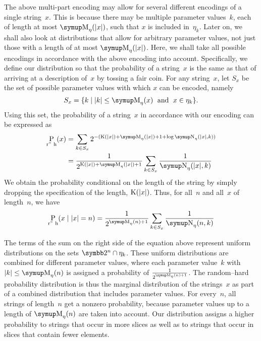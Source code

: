 The above multi-part encoding may allow for several different encodings of a single string~$x$.
This is because there may be multiple parameter values~$k$, each of length at most $\upM_\eta(\length{x})$, such that $x$ is included in~$\eta_k$.
Later on, we shall also look at distributions that allow for arbitrary parameter values, not just those with a length of at most $\upM_\eta(\length{x})$.
Here, we shall take all possible encodings in accordance with the above encoding into account.
Specifically, we define our distribution so that the probability of a string~$x$ is the same as that of arriving at a description of~$x$ by tossing a fair coin.
For any string~$x$, let $S_x$ be the set of possible parameter values with which $x$ can be encoded, namely
\begin{equation*}
  S_x \deq\{k \st \length{k} \le \upM_\eta(x) \reland x \in \eta_k\}.
\end{equation*}
Using this set, the probability of a string~$x$ in accordance with our encoding can be expressed as
\begin{align*}
  \Pr_\mathrm{r"~h}(x) &\deq \sum_{k \in S_x} 2^{-(\KC(\length{x}) + \upM_\eta(\length{x}) + 1 + \log \upN_\eta(\length{x}, k))} \\
    &= \frac{1}{2^{\KC(\length{x}) + \upM_\eta(\length{x}) + 1}} \sum_{k \in S_x} \frac{1}{\upN_\eta(\length{x}, k)}
\end{align*}
We obtain the probability conditional on the length of the string by simply dropping the specification of the length, $\operatorname{K}({\lvert x\rvert})$.
Thus, for all~$n$ and all~$x$ of length~$n$, we have
\begin{equation*}
  \Pr_\mathrm{r"~h}(x \given \length{x} = n) = \frac{1}{2^{\upM_\eta(n) + 1}} \sum_{k \in S_x} \frac{1}{\upN_\eta(n, k)}
\end{equation*}

The terms of the sum on the right side of the equation above represent uniform distributions on the sets $\binary^n \cap \eta_k$.
These uniform distributions are combined for different parameter values, where each parameter value~$k$ with $\length{k} \le \upM_\eta(n)$ is assigned a probability of $\frac{1}{2^{\upM_\eta(n) + 1}}$.
The random--hard probability distribution is thus the marginal distribution of the strings~$x$ as part of a combined distribution that includes parameter values.
For every~$n$, all strings of length~$n$ get a nonzero probability, because parameter values up to a length of $\upM_\eta(n)$ are taken into account.
Our distribution assigns a higher probability to strings that occur in more slices as well as to strings that occur in slices that contain fewer elements.

